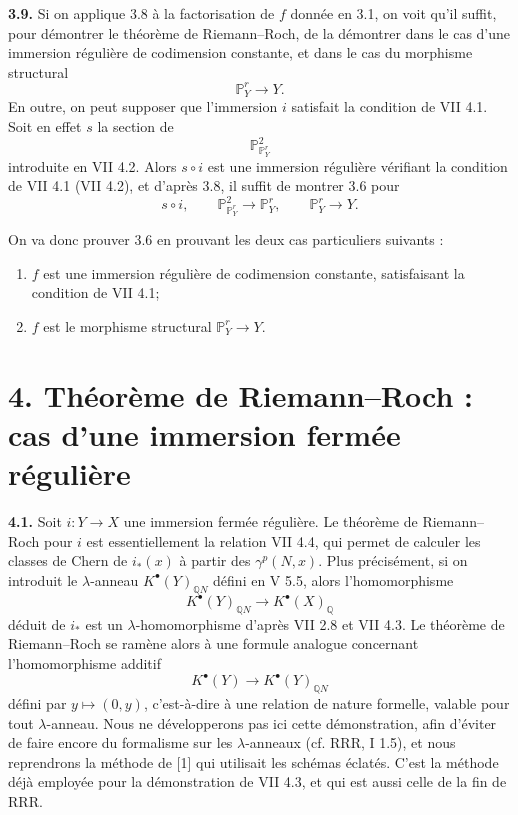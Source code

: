 \documentclass[11pt]{article}
\newcommand{\RRR}{\mathrm{RRR}}
\begin{document}
\textbf{3.9.} Si on applique 3.8 à la factorisation de \(f\) donnée en 3.1, on voit qu'il suffit, pour démontrer le théorème de Riemann--Roch, de la démontrer dans le cas d'une immersion régulière de codimension constante, et dans le cas du morphisme structural
\[
 \mathbb P^r_Y\longrightarrow Y .
\]
En outre, on peut supposer que l'immersion \(i\) satisfait la condition de VII 4.1. Soit en effet \(s\) la section de
\[
 \mathbb P^2_{\mathbb P^r_Y}
\]
introduite en VII 4.2. Alors \(s\circ i\) est une immersion régulière vérifiant la condition de VII 4.1 (VII 4.2), et d'après 3.8, il suffit de montrer 3.6 pour
\[
s\circ i,\qquad
\mathbb P^2_{\mathbb P^r_Y}\longrightarrow\mathbb P^r_Y,\qquad
\mathbb P^r_Y\longrightarrow Y .
\]

On va donc prouver 3.6 en prouvant les deux cas particuliers suivants :
\begin{enumerate}[label=\roman*)]
\item \(f\) est une immersion régulière de codimension constante, satisfaisant la condition de VII 4.1;
\item \(f\) est le morphisme structural \(\mathbb P^r_Y\to Y\).
\end{enumerate}

\section*{4. Théorème de Riemann--Roch : cas d'une immersion fermée régulière}

\textbf{4.1.} Soit \(i:Y\to X\) une immersion fermée régulière. Le théorème de Riemann--Roch pour \(i\) est essentiellement la relation VII 4.4, qui permet de calculer les classes de Chern de \(i_*(x)\) à partir des \(\gamma^p(N,x)\). Plus précisément, si on introduit le \(\lambda\)-anneau \(K^{\bullet}(Y)_{\mathbb Q N}\) défini en V 5.5, alors l'homomorphisme
\[
K^{\bullet}(Y)_{\mathbb Q N}\longrightarrow K^{\bullet}(X)_{\mathbb Q}
\]
déduit de \(i_*\) est un \(\lambda\)-homomorphisme d'après VII 2.8 et VII 4.3. Le théorème de Riemann--Roch se ramène alors à une formule analogue concernant l'homomorphisme additif
\[
K^{\bullet}(Y)\longrightarrow K^{\bullet}(Y)_{\mathbb Q N}
\]
défini par \(y\mapsto(0,y)\), c'est-à-dire à une relation de nature formelle, valable pour tout \(\lambda\)-anneau. Nous ne développerons pas ici cette démonstration, afin d'éviter de faire encore du formalisme sur les \(\lambda\)-anneaux (cf. \(\RRR\), I 1.5), et nous reprendrons la méthode de [1] qui utilisait les schémas éclatés. C'est la méthode déjà employée pour la démonstration de VII 4.3, et qui est aussi celle de la fin de \(\RRR\).
\end{document}
